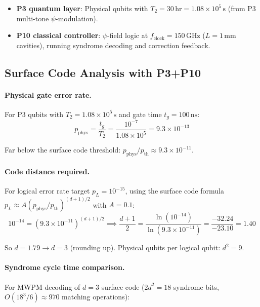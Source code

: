 \documentclass[11pt]{article}
\theoremstyle{definition}
\theoremstyle{remark}
\begin{document}
\begin{itemize}
\item \textbf{P3 quantum layer}: Physical qubits with $T_2 = 30\,\mathrm{hr}
= 1.08\times 10^5\,\mathrm{s}$ (from P3 multi-tone $\psi$-modulation).
\item \textbf{P10 classical controller}: $\psi$-field logic at
  $f_{\mathrm{clock}} = 150\,\mathrm{GHz}$ ($L = 1\,\mathrm{mm}$ cavities),
  running syndrome decoding and correction feedback.
\end{itemize}

\subsection{Surface Code Analysis with P3+P10}

\paragraph{Physical gate error rate.}
For P3 qubits with $T_2 = 1.08\times 10^5\,\mathrm{s}$ and gate time
$t_g = 100\,\mathrm{ns}$:
\begin{equation}
p_{\mathrm{phys}} = \frac{t_g}{T_2} = \frac{10^{-7}}{1.08\times 10^5}
= 9.3\times 10^{-13}
\label{eq:phys_error}
\end{equation}

Far below the surface code threshold: $p_{\mathrm{phys}}/p_{\mathrm{th}}
\approx 9.3\times 10^{-11}$.

\paragraph{Code distance required.}
For logical error rate target $p_L = 10^{-15}$, using the surface code
formula $p_L \approx A(p_{\mathrm{phys}}/p_{\mathrm{th}})^{(d+1)/2}$
with $A = 0.1$:
\begin{equation}
10^{-14} = \left(9.3\times 10^{-11}\right)^{(d+1)/2}
\implies \frac{d+1}{2} = \frac{\ln(10^{-14})}{\ln(9.3\times 10^{-11})}
= \frac{-32.24}{-23.10} = 1.40
\end{equation}

So $d = 1.79 \to d = 3$ (rounding up). Physical qubits per logical qubit:
$d^2 = 9$.

\paragraph{Syndrome cycle time comparison.}

For MWPM decoding of $d = 3$ surface code ($2d^2 = 18$ syndrome bits,
$O(18^3/6) \approx 970$ matching operations):
\end{document}
